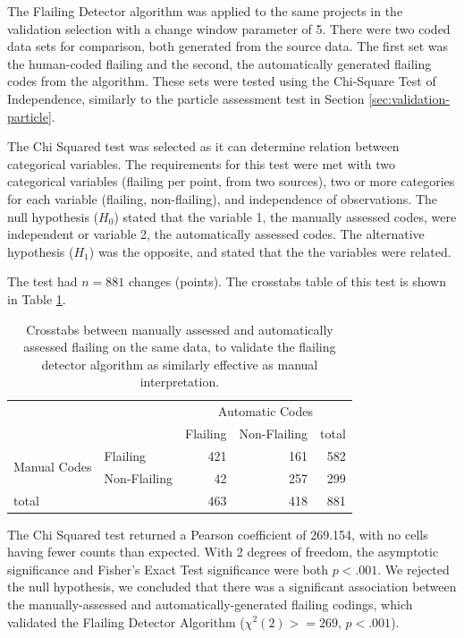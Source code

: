 The Flailing Detector algorithm was applied to the same projects in the validation selection with a change window parameter of 5. There were two coded data sets for comparison, both generated from the source data. The first set was the human-coded flailing and the second, the automatically generated flailing codes from the algorithm. These sets were tested using the Chi-Square Test of Independence, similarly to the particle assessment test in Section \ref{sec:validation-particle}.

The Chi Squared test was selected as it can determine relation between categorical variables. The requirements for this test were met with two categorical variables (flailing per point, from two sources), two or more categories for each variable (flailing, non-flailing), and independence of observations. The null hypothesis ($H_0$) stated that the variable 1, the manually assessed codes, were independent or variable 2, the automatically assessed codes. The alternative hypothesis ($H_1$) was the opposite, and stated that the the variables were related.

The test had $n=881$ changes (points). The crosstabs table of this test is shown in Table \ref{tab:crosstab-flailing-detector}.
\begin{table}
\begin{centering}
	\begin{tabular}{l l r r | r}
			&& \multicolumn{3}{c}{Automatic Codes} 	\\
			&	& Flailing 	& Non-Flailing 	& total	\\ \hline
	\multirow{2}{*}{Manual Codes}
	& Flailing 		& 421	& 161		& 582	\\
	& Non-Flailing	& 42	& 257		& 299	\\ \hline
	total	&  		& 463	& 418		& 881
	\end{tabular}
	\caption[Flailing Crosstabs for Flailing Detector Validation]{Crosstabs between manually assessed and automatically assessed flailing on the same data, to validate the flailing detector algorithm as similarly effective as manual interpretation.}
	\label{tab:crosstab-flailing-detector}
\end{centering}
\end{table}

The Chi Squared test returned a Pearson coefficient of 269.154, with no cells having fewer counts than expected. With 2 degrees of freedom, the asymptotic significance and Fisher's Exact Test significance were both $p<.001$. We rejected the null hypothesis, we concluded that there was a significant association between the manually-assessed and automatically-generated flailing codings, which validated the Flailing Detector Algorithm ($\chi^2(2)>= 269$, $p < .001$). 





